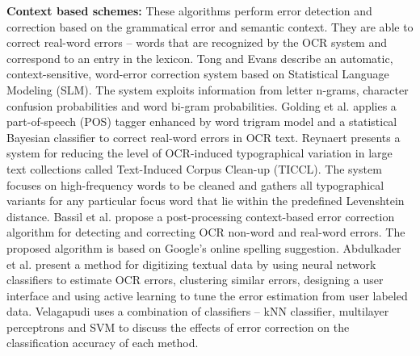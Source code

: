 \documentclass[letterpaper]{article}
\begin{document}
\noindent \textbf{Context based schemes: }These algorithms perform error detection and correction based on the grammatical error and semantic context. They are able to correct real-word errors -- words that are recognized by the OCR system and correspond to an entry in the lexicon. Tong and Evans \cite{Tong96astatistical} describe an automatic, context-sensitive, word-error correction system based on Statistical Language Modeling (SLM). The system exploits information from letter n-grams, character confusion probabilities and word bi-gram probabilities. Golding et al. \cite{contextbased} applies a part-of-speech (POS) tagger enhanced by word trigram model and a statistical Bayesian classifier to correct real-word errors in OCR text. Reynaert \cite{Reynaert2008a} presents a system for reducing the level of OCR-induced typographical variation in large text collections called Text-Induced Corpus Clean-up (TICCL). The system focuses on high-frequency words to be cleaned and gathers all typographical variants for any particular focus word that lie within the predefined Levenshtein distance. Bassil et al. \cite{Bassil_12a,Bassil_12b} propose a post-processing context-based error correction algorithm for detecting and correcting OCR non-word and real-word errors. The proposed algorithm is based on Google's online spelling suggestion. Abdulkader et al. \cite{lowcost}  present a method for digitizing textual data by using neural network classifiers to estimate OCR errors, clustering similar errors, designing a user interface and using active learning to tune the error estimation from user labeled data. 
Velagapudi \cite{velagapudi} uses a combination of classifiers -- kNN classifier,  multilayer perceptrons and SVM to discuss the effects of error correction on the classification accuracy of each method. 
\end{document}
